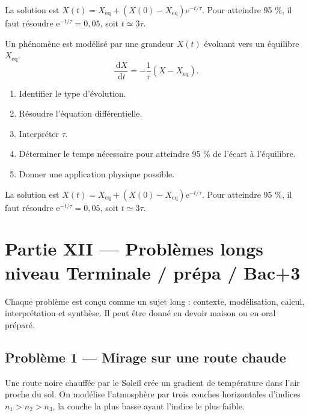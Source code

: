 \documentclass[11pt,a4paper]{article}
\newcommand{\dd}{\,\mathrm d}
\newcommand{\e}{\mathrm e}
\begin{document}
\begin{corrigebox}[Correction 14]
La solution est $X(t)=X_{\mathrm{eq}}+(X(0)-X_{\mathrm{eq}})\e^{-t/\tau}$. Pour atteindre 95 \%, il faut résoudre $\e^{-t/\tau}=0{,}05$, soit $t\simeq3\tau$.
\end{corrigebox}

\begin{exercicebox}
Un phénomène est modélisé par une grandeur $X(t)$ évoluant vers un équilibre $X_{\mathrm{eq}}$.
\[
\frac{\dd X}{\dd t}=-\frac1\tau(X-X_{\mathrm{eq}}).
\]
\begin{enumerate}
  \item Identifier le type d'évolution.
  \item Résoudre l'équation différentielle.
  \item Interpréter $\tau$.
  \item Déterminer le temps nécessaire pour atteindre 95 \% de l'écart à l'équilibre.
  \item Donner une application physique possible.
\end{enumerate}
\end{exercicebox}

\begin{corrigebox}[Correction 15]
La solution est $X(t)=X_{\mathrm{eq}}+(X(0)-X_{\mathrm{eq}})\e^{-t/\tau}$. Pour atteindre 95 \%, il faut résoudre $\e^{-t/\tau}=0{,}05$, soit $t\simeq3\tau$.
\end{corrigebox}


\section{Partie XII — Problèmes longs niveau Terminale / prépa / Bac+3}

\begin{attentionbox}[Format]
Chaque problème est conçu comme un sujet long : contexte, modélisation, calcul, interprétation et synthèse. Il peut être donné en devoir maison ou en oral préparé.
\end{attentionbox}

\subsection{Problème 1 — Mirage sur une route chaude}

\begin{exercicebox}[Énoncé]
Une route noire chauffée par le Soleil crée un gradient de température dans l'air proche du sol. On modélise l'atmosphère par trois couches horizontales d'indices $n_1>n_2>n_3$, la couche la plus basse ayant l'indice le plus faible.
\end{exercicebox}
\end{document}
